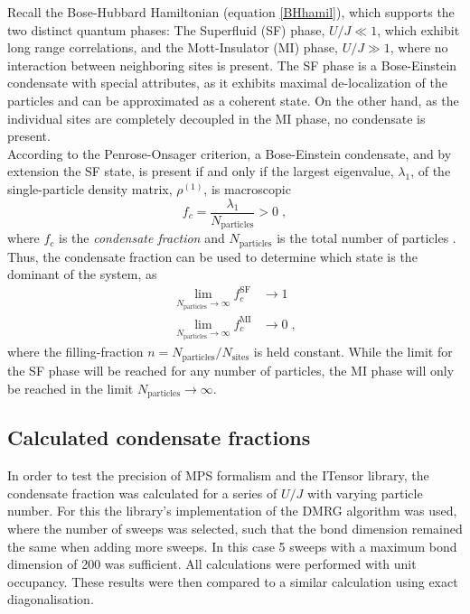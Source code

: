 Recall the Bose-Hubbard Hamiltonian (equation \ref{BHhamil}), which supports the two distinct quantum phases: The Superfluid (SF) phase, $U/J \ll 1$, which exhibit long range correlations, and the Mott-Insulator (MI) phase, $U/J \gg 1$, where no interaction between neighboring sites is present. The SF phase is a Bose-Einstein condensate with special attributes, as it exhibits maximal de-localization of the particles and can be approximated as a coherent state. On the other hand, as the individual sites are completely decoupled in the MI phase, no condensate is present. \\
According to the Penrose-Onsager criterion, a Bose-Einstein condensate, and by extension the SF state, is present if and only if the largest eigenvalue, $\lambda_1$, of the single-particle density matrix, $\rho^{(1)}$, is macroscopic
\begin{equation}
	f_c = \frac{\lambda_1}{N_{\mathrm{particles}}} > 0 \; ,
\end{equation} 
where $f_c$ is the \textit{condensate fraction} and $N_{\mathrm{particles}}$ is the total number of particles \cite{PenroseOnsager}. Thus, the condensate fraction can be used to determine which state is the dominant of the system, as
\begin{align}
	\lim_{N_{\mathrm{particles}} \to \infty} f_{c}^{\mathrm{SF}} &\to 1 \label{eq:SF_lim} \\
	\lim_{N_{\mathrm{particles}} \to \infty} f_{c}^{\mathrm{MI}} &\to 0 \; , \label{eq:MI_lim}
\end{align}
where the filling-fraction $n = N_{\mathrm{particles}}/N_{\mathrm{sites}}$ is held constant. While the limit for the SF phase will be reached for any number of particles, the MI phase will only be reached in the limit $N_{\mathrm{particles}} \to \infty$.

\subsection{Calculated condensate fractions}
In order to test the precision of MPS formalism and the ITensor library, the condensate fraction was calculated for a series of $U/J$ with varying particle number. For this the library's implementation of the DMRG algorithm was used, where the number of sweeps was selected, such that the bond dimension remained the same when adding more sweeps. In this case 5 sweeps with a maximum bond dimension of 200 was sufficient. All calculations were performed with unit occupancy. These results were then compared to a similar calculation using exact diagonalisation.

